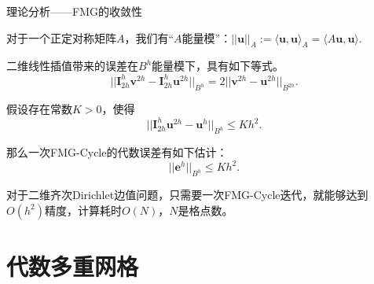 \documentclass[9pt]{beamer}
\begin{document}
\begin{frame}{理论分析——FMG的收敛性}
  \small

  \begin{definition}
    \small
    对于一个正定对称矩阵$A$，我们有“$A$能量模”：$||\mathbf{u}||_A:=\langle \mathbf{u},\mathbf{u} \rangle_A=\langle A\mathbf{u},\mathbf{u} \rangle$.
  \end{definition}

  \pause
  \begin{lemma}
    \small
    二维线性插值带来的误差在$B^h$能量模下，具有如下等式。
    \begin{equation}
      ||\mathbf{I}_{2h}^h\mathbf{v}^{2h}-\mathbf{I}_{2h}^h\mathbf{u}^{2h}||_{B^h}=2||\mathbf{v}^{2h}-\mathbf{u}^{2h}||_{B^{2h}}.
    \end{equation}
  \end{lemma}

  \pause
  \begin{lemma}
    \small
    假设存在常数$K>0$，使得
    \begin{equation}
      ||\mathbf{I}_{2h}^h \mathbf{u}^{2h}-\mathbf{u}^{h}||_{B^h}\leq Kh^2.
    \end{equation}
  
    那么一次FMG-Cycle的代数误差有如下估计：
    \begin{equation}
      ||\mathbf{e}^h||_{B^h}\leq Kh^2.
    \end{equation}
  \end{lemma}

  \pause
  \begin{theorem}
    \small
    对于二维齐次Dirichlet边值问题，只需要一次FMG-Cycle迭代，就能够达到$O(h^2)$精度，计算耗时$O(N)$，$N$是格点数。
  \end{theorem}
\end{frame}


\section{代数多重网格}
\end{document}
